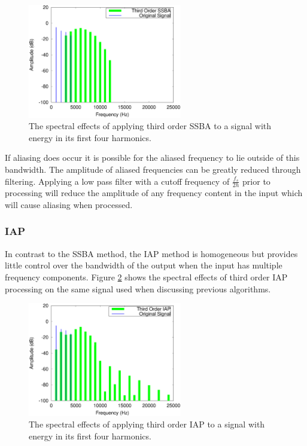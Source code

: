 			\begin{figure}[h!]
				\centering
				\includegraphics[width=0.6\textwidth]{chapter5/Images/SSBA3Spectra.eps}
				\caption{The spectral effects of applying third order SSBA to a signal with energy in its 
				         first four harmonics.}
				\label{fig:SSBA3Spectra}
			\end{figure}

			If aliasing does occur it is possible for the aliased frequency to lie outside of this bandwidth.
			The amplitude of aliased frequencies can be greatly reduced through filtering. Applying a low pass
			filter with a cutoff frequency of $\frac{f_{s}}{2h}$ prior to processing will reduce the amplitude
			of any frequency content in the input which will cause aliasing when processed.

		\subsubsection*{IAP}
			In contrast to the SSBA method, the IAP method is homogeneous but provides little control over the
			bandwidth of the output when the input has multiple frequency components. Figure
			\ref{fig:IAP3Spectra} shows the spectral effects of third order IAP processing on the same signal
			used when discussing previous algorithms.

			\begin{figure}[h!]
				\centering
				\includegraphics[width=0.6\textwidth]{chapter5/Images/IAP3Spectra.eps}
				\caption{The spectral effects of applying third order IAP to a signal with energy in its 
				         first four harmonics.}
				\label{fig:IAP3Spectra}
			\end{figure}

